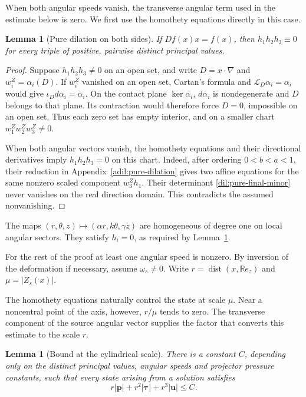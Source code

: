 \documentclass[11pt,a4paper]{article}
\numberwithin{equation}{section}
\theoremstyle{plain}
\newtheorem{lemma}[theorem]{Lemma}
\theoremstyle{definition}
\theoremstyle{remark}
\begin{document}
When both angular speeds vanish, the transverse angular term used
in the estimate below is zero. We first use the homothety equations
directly in this case.

\begin{lemma}[Pure dilation on both sides]\label{dil:pure}
If $Df(x)x=f(x)$, then $h_1h_2h_3\equiv0$ for every triple of positive,
pairwise distinct principal values.
\end{lemma}
\begin{proof}
Suppose $h_1h_2h_3\ne0$ on an open set, and write
$D=x\cdot\nabla$ and $w_i^Z=\alpha_i(D)$. If $w_i^Z$ vanished on an open set,
Cartan's formula and $\mathcal L_D\alpha_i=\alpha_i$ would give
$\iota_Dd\alpha_i=\alpha_i$.  On the contact plane $\ker\alpha_i$,
$d\alpha_i$ is nondegenerate and $D$ belongs to that plane.  Its
contraction would therefore force $D=0$, impossible on an open set.
Thus each zero set has empty interior, and on a smaller chart $w_1^Zw_2^Zw_3^Z\ne0$.

When both angular vectors vanish, the homothety equations and their
directional derivatives imply $h_1h_2h_3=0$ on this chart.
Indeed, after ordering $0<b<a<1$, their reduction in
Appendix~\ref{adil:pure-dilation} gives two affine equations for the
same nonzero scaled component $w_3^Zh_1$. Their determinant
\eqref{dil:pure-final-minor} never vanishes on the real direction
domain. This contradicts the assumed nonvanishing.
\end{proof}

The maps
$(r,\theta,z)\mapsto(\alpha r,k\theta,\gamma z)$ are homogeneous of degree
one on local angular sectors.  They satisfy $h_i=0$, as required by
Lemma~\ref{dil:pure}.

For the rest of the proof at least one angular speed is nonzero.  By
inversion of the deformation if necessary, assume $\omega_s\ne0$.  Write
$r=\operatorname{dist}(x,\mathbb Re_z)$ and $\mu=|Z_s(x)|$.

The homothety equations naturally control the state at scale $\mu$.
Near a noncentral point of the axis, however, $r/\mu$ tends to zero.
The transverse component of the source angular vector supplies the
factor that converts this estimate to the scale $r$.

\begin{lemma}[Bound at the cylindrical scale]\label{dil:cyl-bound}
There is a constant $C$, depending only on the distinct principal
values, angular speeds and projector pressure constants, such that
every state arising from a solution satisfies
\begin{equation}\label{dil:jet-bound}
                  r|\boldsymbol p|+r^2|\boldsymbol\tau|+r^3|\boldsymbol u|\le C.
\end{equation}
\end{lemma}
\end{document}
